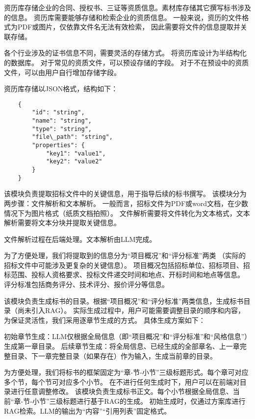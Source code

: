 \documentclass{xmu}
\begin{document}
资历库存储企业的合同、授权书、三证等资质信息。素材库存储其它撰写标书涉及的信息。
资历库需要能够存储和检索企业的资质信息。
一般来说，资历的文件格式为PDF或图片，仅依靠文件名无法有效检索，
因此需要将文件的信息提取并关联存储。

各个行业涉及的证书信息不同，需要灵活的存储方式。
将资历库设计为半结构化的数据库。
对于常见的资质文件，可以预设存储的字段。
对于不在预设中的资质文件，可以由用户自行增加存储字段。

资历库存储以JSON格式，结构如下：

\begin{verbatim}
    {
        "id": "string",
        "name": "string",
        "type": "string",
        "file\_path": "string",
        "properties": {
            "key1": "value1",
            "key2": "value2"
        }
    }
\end{verbatim}

该模块负责提取招标文件中的关键信息，用于指导后续的标书撰写。
该模块分为两步骤：文件解析和文本解析。
一般而言，招标文件为PDF或word文档，在少数情况下为图片格式（纸质文档拍照）。
文件解析需要将文件转化为文本格式，文本解析需要将文本分块并提取关键信息。

文件解析过程在后端处理。文本解析由LLM完成。

为了方便处理，我们将提取到的信息分为“项目概况”和“评分标准”两类
（实际的招标文件中可能涉及更复杂的关键信息）。
项目概况包括招标单位、招标项目、招标范围、投标人资格要求、投标文件递交时间和地点、开标时间和地点等信息。
评分标准包括商务评分、技术评分、报价评分等信息。

该模块负责生成标书的目录。根据“项目概况”和“评分标准”两类信息，生成标书目录（尚未引入RAG）。
实际生成过程中，用户可能需要调整目录的顺序和内容，为保证灵活性，我们采用逐章节生成的方式。
具体生成方案如下：

初始章节生成：LLM仅根据全局信息（即“项目概况”和“评分标准”和“风格信息”）生成第一章目录。
后续章节生成：将全局信息、已经生成的全部章名、上一章完整目录、下一章完整目录（如果存在）作为输入，生成当前章的目录。

为方便处理，我们将标书的框架固定为“章-节-小节”三级标题形式。每个章可对应多个节，每个节可对应多个小节。
在不进行任何生成时下，用户可以在前端对目录进行任意调整修改。
该模块负责生成标书正文。每个小节根据全局信息、当前“章-节-小节”三级标题进行基于RAG的生成。
初始生成时，仅通过方案库进行RAG检索。LLM的输出为“内容”“引用列表”固定格式。
\end{document}
